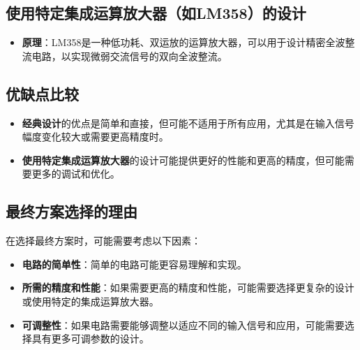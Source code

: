 \documentclass[UTF8,titlepage,a4paper]{ctexart}
\numberwithin{figure}{section}
\begin{document}
\subsection{使用特定集成运算放大器（如LM358）的设计}
\begin{itemize}
    \item \textbf{原理}：LM358是一种低功耗、双运放的运算放大器，可以用于设计精密全波整流电路，以实现微弱交流信号的双向全波整流。
\end{itemize}

\subsection{优缺点比较}
\begin{itemize}
    \item \textbf{经典设计}的优点是简单和直接，但可能不适用于所有应用，尤其是在输入信号幅度变化较大或需要更高精度时。
    \item \textbf{使用特定集成运算放大器}的设计可能提供更好的性能和更高的精度，但可能需要更多的调试和优化。
\end{itemize}

\subsection{最终方案选择的理由}
在选择最终方案时，可能需要考虑以下因素：
\begin{itemize}
    \item \textbf{电路的简单性}：简单的电路可能更容易理解和实现。
    \item \textbf{所需的精度和性能}：如果需要更高的精度和性能，可能需要选择更复杂的设计或使用特定的集成运算放大器。
    \item \textbf{可调整性}：如果电路需要能够调整以适应不同的输入信号和应用，可能需要选择具有更多可调参数的设计。
\end{itemize}


\end{document}
